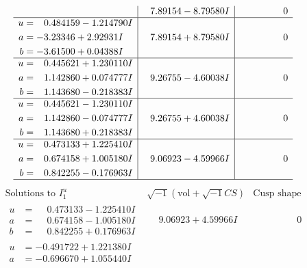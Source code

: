 \documentclass[1p]{elsarticle_modified}
\theoremstyle{definition}
\newcommand{\I}{\sqrt{-1}}
\begin{document}
$$\begin{array}{c|c|c}
 & \phantom{-}7.89154 - 8.79580 I & \phantom{-0.000000 } 0 \\ \hline\begin{aligned}
u &= \phantom{-}0.484159 - 1.214790 I \\
a &= -3.23346 + 2.92931 I \\
b &= -3.61500 + 0.04388 I\end{aligned}
 & \phantom{-}7.89154 + 8.79580 I & \phantom{-0.000000 } 0 \\ \hline\begin{aligned}
u &= \phantom{-}0.445621 + 1.230110 I \\
a &= \phantom{-}1.142860 + 0.074777 I \\
b &= \phantom{-}1.143680 - 0.218383 I\end{aligned}
 & \phantom{-}9.26755 - 4.60038 I & \phantom{-0.000000 } 0 \\ \hline\begin{aligned}
u &= \phantom{-}0.445621 - 1.230110 I \\
a &= \phantom{-}1.142860 - 0.074777 I \\
b &= \phantom{-}1.143680 + 0.218383 I\end{aligned}
 & \phantom{-}9.26755 + 4.60038 I & \phantom{-0.000000 } 0 \\ \hline\begin{aligned}
u &= \phantom{-}0.473133 + 1.225410 I \\
a &= \phantom{-}0.674158 + 1.005180 I \\
b &= \phantom{-}0.842255 - 0.176963 I\end{aligned}
 & \phantom{-}9.06923 - 4.59966 I & \phantom{-0.000000 } 0\\
 \hline 
 \end{array}$$\newpage$$\begin{array}{c|c|c}  
\text{Solutions to }I^u_{1}& \I (\text{vol} + \sqrt{-1}CS) & \text{Cusp shape}\\
 \hline 
\begin{aligned}
u &= \phantom{-}0.473133 - 1.225410 I \\
a &= \phantom{-}0.674158 - 1.005180 I \\
b &= \phantom{-}0.842255 + 0.176963 I\end{aligned}
 & \phantom{-}9.06923 + 4.59966 I & \phantom{-0.000000 } 0 \\ \hline\begin{aligned}
u &= -0.491722 + 1.221380 I \\
a &= -0.696670 + 1.055440 I \\

\end{aligned}
\end{array}$$
\end{document}
